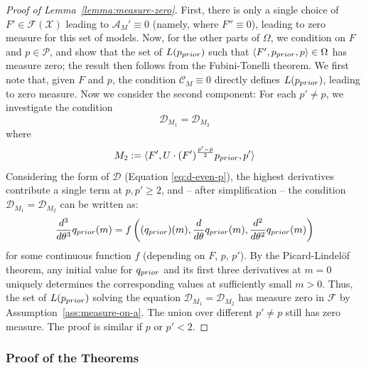 \begin{proof}[Proof of Lemma~\ref{lemma:measure-zero}]
First, there is only a single choice of $F' \in \mathcal{F}(\mathcal{X})$ leading to $\mathcal{A}_M' \equiv 0$ (namely, where $F'' \equiv 0$), leading to zero measure for this set of models.
Now, for the other parts of $\Omega$, we condition on $F$ and $p \in \mathcal{P}$, and show that the set of $L(p_{prior})$ such that $\langle F', p_{prior}, p\rangle \in \Omega$ has measure zero; the result then follows from the Fubini-Tonelli theorem. 
We first note that, given $F$ and $p$, the condition $\mathcal{C}_M \equiv 0$ directly defines $L(p_{prior})$, leading to zero measure.
Now we consider the second component: For each $p' \neq p$, we investigate the condition
\begin{equation}
    \mathcal{D}_{M_1} = \mathcal{D}_{M_2}
\end{equation}
where 
\begin{equation}
    M_2 := \langle F', U \cdot (F')^{\frac{\tilde{p}'-\tilde{p}}{2}} p_{prior}, p'\rangle
\end{equation}
Considering the form of $\mathcal{D}$ (Equation \ref{eq:d-even-p}), the highest derivatives contribute a single term at $p,p'\geq 2$, and -- after simplification -- the condition $\mathcal{D}_{M_1} = \mathcal{D}_{M_2}$ can be written as:
\begin{equation}
     \frac{d^3}{d\theta^3} q_{prior}(m)  = f\left((q_{prior})(m), \frac{d}{d\theta} q_{prior}(m), \frac{d^2}{d\theta^2} q_{prior}(m)\right)
\end{equation}
for some continuous function $f$ (depending on $F$, $p$, $p'$).
By the Picard-Lindel{\"o}f theorem, any initial value for $q_{prior}$ and its first three derivatives at $m = 0$ uniquely determines the corresponding values at sufficiently small $m>0$. Thus, the set of $L(p_{prior})$ solving the equation $\mathcal{D}_{M_1} = \mathcal{D}_{M_2}$ has measure zero in $\mathcal{F}$ by Assumption~\ref{ass:measure-on-a}.
The union over different $p' \neq p$ still has zero measure.
The proof is similar if $p$ or $p' < 2$.



\end{proof}


\subsubsection{Proof of the Theorems}


